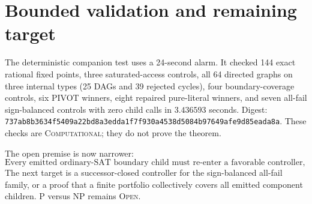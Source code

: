 \documentclass[11pt]{article}
\begin{document}
\section{Bounded validation and remaining target}
The deterministic companion test uses a 24-second alarm.  It checked 144
exact rational fixed points, three saturated-access controls, all 64 directed
graphs on three internal types (25 DAGs and 39 rejected cycles), four
boundary-coverage controls, six PIVOT winners, eight repaired pure-literal
winners, and seven all-fail sign-balanced controls with zero child calls in
$3.436593$ seconds.  Digest:
\texttt{737ab8b3634f5409a22bd8a3edda1f7f930a4538d5084b97649afe9d85eada8a}.
These checks are \textsc{Computational}; they do not prove the theorem.

The open premise is now narrower:
\[
\boxed{\text{Every emitted ordinary-SAT boundary child must re-enter a
favorable controller, with common charged failure bounds.}}
\]
The next target is a successor-closed controller for the sign-balanced
all-fail family, or a proof that a finite portfolio collectively covers all
emitted component children.  P versus NP remains \textsc{Open}.

\end{document}
